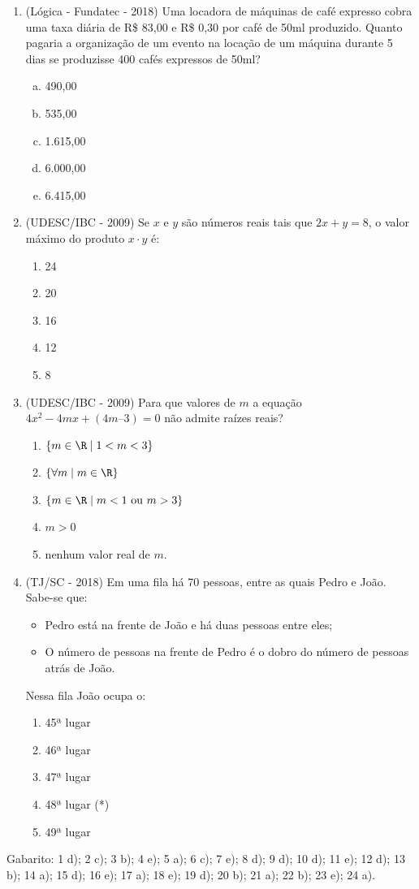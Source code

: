 \begin{enumerate}
 \item (Lógica - Fundatec - 2018) Uma locadora de máquinas de café expresso cobra uma taxa diária de R\$ 83,00 e R\$ 0,30 por café de 50ml produzido. Quanto pagaria a organização de um evento na locação de um máquina durante 5 dias se produzisse 400 cafés expressos de 50ml?
\begin{multicols}{2}
\begin{enumerate}[a)]
\item 490,00
\item 535,00
\item 1.615,00
\item 6.000,00
\item 6.415,00
\end{enumerate}
\end{multicols}

 \item (UDESC/IBC - 2009) Se $x$ e $y$ são números reais tais que $2x + y = 8$, o valor máximo do produto $x \cdot y$ é:
 \begin{enumerate}
 \item 24
 \item 20
 \item 16
 \item 12
 \item 8
 \end{enumerate}

 \item (UDESC/IBC - 2009) Para que valores de $m$ a equação $4x^2- 4mx + (4m – 3) = 0$ não admite raízes reais?
 \begin{enumerate}
 \item $\{m \in \R \mid 1< m < 3\}$
 \item $\{\forall m \mid m \in \R\}$
 \item $\{m \in \R \mid m < 1 \text{ ou } m > 3\}$
 \item $m > 0$
 \item nenhum valor real de $m$.
 \end{enumerate}

 \item (TJ/SC - 2018) Em uma fila há 70 pessoas, entre as quais Pedro e João. Sabe-se que:
  \begin{itemize}
   \item Pedro está na frente de João e há duas pessoas entre eles;
   \item O número de pessoas na frente de Pedro é o dobro do número de pessoas atrás de João.
  \end{itemize}
  Nessa fila João ocupa o:
  \begin{enumerate}
  \item 45ª lugar
  \item 46ª lugar
  \item 47ª lugar
  \item 48ª lugar (*)
  \item 49ª lugar
 \end{enumerate}

 \end{enumerate}

 Gabarito: 1 d); 2 c); 3 b); 4 e); 5 a); 6 c); 7 e); 8 d); 9 d); 10 d); 11 e); 12 d); 13 b); 14 a); 15 d); 16 e); 17 a); 18 e); 19 d); 20 b); 21 a); 22 b); 23 e); 24 a).
